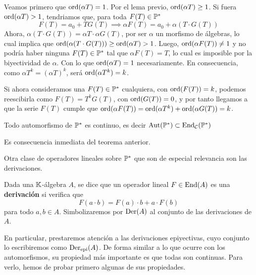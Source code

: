\begin{demo}
    Veamos primero que $\operatorname*{ord}(\alpha T) = 1$. Por el lema previo, $\operatorname*{ord}(\alpha T) \geq 1$. Si fuera $\operatorname*{ord}(\alpha T) > 1$, tendriamos que, para toda $F(T) \in \mathbb{P}^*$
    \begin{equation*}
        F(T) = a_0 + T G(T) \implies \alpha F(T) = a_0 + \alpha (T \cdot G(T))
    \end{equation*}
    Ahora, $\alpha (T \cdot G(T)) = \alpha T \cdot \alpha G(T)$, por ser $\alpha$ un morfismo de álgebras, lo cual implica que $\operatorname*{ord}(\alpha (T \cdot G(T))) \geq \operatorname*{ord}(\alpha T) > 1$. Luego, $\operatorname*{ord}(\alpha F(T)) \neq 1$ y no podría haber ninguna $F(T) \in \mathbb{P}^*$ tal que $\alpha F(T) = T$, lo cual es imposible por la biyectividad de $\alpha$. Con lo que $\operatorname*{ord}(\alpha T) = 1$ necesariamente. En consecuencia, como $\alpha T^k = (\alpha T)^k$, será $\operatorname*{ord}(\alpha T^k) = k$.

    Si ahora consideramos una $F(T) \in \mathbb{P}^*$ cualquiera, con $\operatorname*{ord}(F(T)) = k$, podemos reescibirla como $F(T) = T^k G(T)$, con $\operatorname*{ord}(G(T)) = 0$, y por tanto llegamos a que la serie $F(T)$ cumple que $\operatorname*{ord}(\alpha F(T)) = \operatorname*{ord}(\alpha T^k) + \operatorname*{ord}(\alpha G(T)) = k$.
\end{demo}

\begin{teorema}\label{auto implica continuo}
    Todo automorfismo de $\mathbb{P}^*$ es continuo, es decir $\operatorname*{Aut}(\mathbb{P}^*) \subset \operatorname*{End}_{\mathcal{C}}(\mathbb{P}^*)$
\end{teorema}

\begin{demo}
    Es consecuencia inmediata del teorema anterior.
\end{demo}

Otra clase de operadores lineales sobre $\mathbb{P}^*$ que son de especial relevancia son las derivaciones.

\begin{definicion}
    Dada una $\mathbb{K}$-álgebra $A$, se dice que un operador lineal $F \in \operatorname*{End}(A)$ es una \textbf{derivación} si verifica que
    \begin{equation*}
        F(a \cdot b) = F(a) \cdot b + a \cdot F(b)
    \end{equation*}
    para todo $a,b \in A$. Simbolizaremos por $\operatorname*{Der}(A)$ al conjunto de las derivaciones de $A$.
\end{definicion}

En particular, prestaremos atención a las derivaciones epiyectivas, cuyo conjunto lo escribiremos como $\operatorname*{Der}_{\mathrm{epi}}(A)$. De forma similar a lo que ocurre con los automorfismos, su propiedad más importante es que todas son continuas. Para verlo, hemos de probar primero algunas de sus propiedades. 

